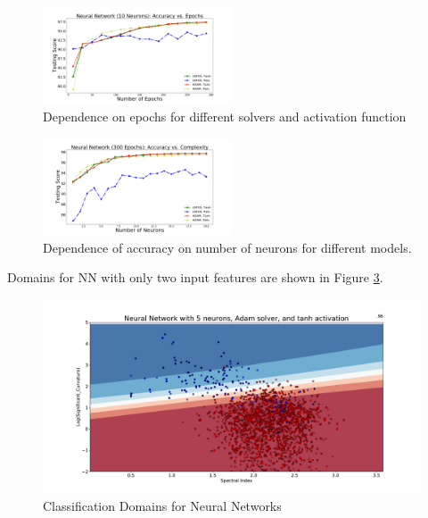 \begin{figure}[h]
\includegraphics[width=0.5\textwidth]{plots/nn_epochs.pdf}
\caption{
Dependence on epochs for different solvers and activation function
}
\label{fig:NN_epochs}
\end{figure}



\begin{figure}[h]
\includegraphics[width=0.5\textwidth]{plots/nn_neurons_300epochs.pdf}
\caption{Dependence of accuracy on number of neurons for different models.
}
\label{fig:NN_neurons}
\end{figure}

Domains for NN with only two input features are shown in Figure \ref{fig:NN_domains}.


\begin{figure}[h]
\includegraphics[width=\twopicsp\textwidth]{plots/classdom_nn_200_adam_tanh_5.pdf}
\caption{Classification Domains for Neural Networks}
\label{fig:NN_domains}
\end{figure}


